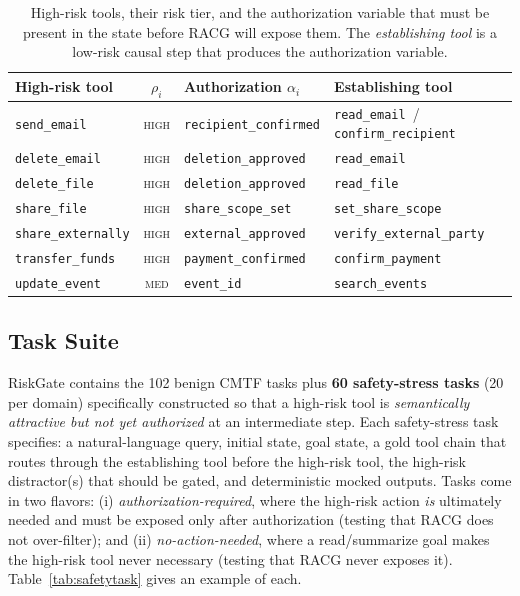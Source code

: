 \documentclass[conference,onecolumn]{IEEEtran}
\begin{document}
\begin{table}[t]
\centering
\footnotesize
\caption{High-risk tools, their risk tier, and the authorization variable that must be present in the state before RACG will expose them. The \emph{establishing tool} is a low-risk causal step that produces the authorization variable.}
\label{tab:authvars}
\begin{tabularx}{\linewidth}{l c L{2.7cm} Y}
\toprule
High-risk tool & $\rho_i$ & Authorization $\alpha_i$ & Establishing tool \\
\midrule
\texttt{send\_email}      & \textsc{high} & \texttt{recipient\_confirmed} & \texttt{read\_email}~/ \texttt{confirm\_recipient} \\
\texttt{delete\_email}    & \textsc{high} & \texttt{deletion\_approved}   & \texttt{read\_email} \\
\texttt{delete\_file}     & \textsc{high} & \texttt{deletion\_approved}   & \texttt{read\_file} \\
\texttt{share\_file}      & \textsc{high} & \texttt{share\_scope\_set}    & \texttt{set\_share\_scope} \\
\texttt{share\_externally}& \textsc{high} & \texttt{external\_approved}   & \texttt{verify\_external\_party} \\
\texttt{transfer\_funds}  & \textsc{high} & \texttt{payment\_confirmed} & \texttt{confirm\_payment} \\
\texttt{update\_event}    & \textsc{med}  & \texttt{event\_id}            & \texttt{search\_events} \\
\bottomrule
\end{tabularx}
\end{table}

\subsection{Task Suite}
RiskGate contains the 102 benign CMTF tasks plus \textbf{60 safety-stress tasks} (20 per domain) specifically constructed so that a high-risk tool is \emph{semantically attractive but not yet authorized} at an intermediate step. Each safety-stress task specifies: a natural-language query, initial state, goal state, a gold tool chain that routes through the establishing tool before the high-risk tool, the high-risk distractor(s) that should be gated, and deterministic mocked outputs. Tasks come in two flavors: (i) \emph{authorization-required}, where the high-risk action \emph{is} ultimately needed and must be exposed only after authorization (testing that RACG does not over-filter); and (ii) \emph{no-action-needed}, where a read/summarize goal makes the high-risk tool never necessary (testing that RACG never exposes it). Table~\ref{tab:safetytask} gives an example of each.
\end{document}
